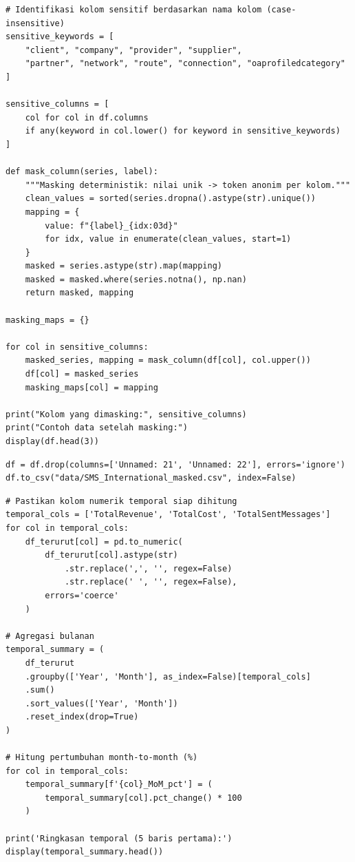 \begin{lstlisting}[style=pycode,caption={Identifikasi dan masking kolom sensitif}]
# Identifikasi kolom sensitif berdasarkan nama kolom (case-insensitive)
sensitive_keywords = [
    "client", "company", "provider", "supplier",
    "partner", "network", "route", "connection", "oaprofiledcategory"
]

sensitive_columns = [
    col for col in df.columns
    if any(keyword in col.lower() for keyword in sensitive_keywords)
]

def mask_column(series, label):
    """Masking deterministik: nilai unik -> token anonim per kolom."""
    clean_values = sorted(series.dropna().astype(str).unique())
    mapping = {
        value: f"{label}_{idx:03d}"
        for idx, value in enumerate(clean_values, start=1)
    }
    masked = series.astype(str).map(mapping)
    masked = masked.where(series.notna(), np.nan)
    return masked, mapping

masking_maps = {}

for col in sensitive_columns:
    masked_series, mapping = mask_column(df[col], col.upper())
    df[col] = masked_series
    masking_maps[col] = mapping

print("Kolom yang dimasking:", sensitive_columns)
print("Contoh data setelah masking:")
display(df.head(3))
\end{lstlisting}

\begin{lstlisting}[style=pycode,caption={Pembersihan kolom tidak diperlukan}]
df = df.drop(columns=['Unnamed: 21', 'Unnamed: 22'], errors='ignore')
df.to_csv("data/SMS_International_masked.csv", index=False)
\end{lstlisting}

\begin{lstlisting}[style=pycode,caption={Agregasi temporal dan perhitungan MoM growth}]
# Pastikan kolom numerik temporal siap dihitung
temporal_cols = ['TotalRevenue', 'TotalCost', 'TotalSentMessages']
for col in temporal_cols:
    df_terurut[col] = pd.to_numeric(
        df_terurut[col].astype(str)
            .str.replace(',', '', regex=False)
            .str.replace(' ', '', regex=False),
        errors='coerce'
    )

# Agregasi bulanan
temporal_summary = (
    df_terurut
    .groupby(['Year', 'Month'], as_index=False)[temporal_cols]
    .sum()
    .sort_values(['Year', 'Month'])
    .reset_index(drop=True)
)

# Hitung pertumbuhan month-to-month (%)
for col in temporal_cols:
    temporal_summary[f'{col}_MoM_pct'] = (
        temporal_summary[col].pct_change() * 100
    )

print('Ringkasan temporal (5 baris pertama):')
display(temporal_summary.head())
\end{lstlisting}

